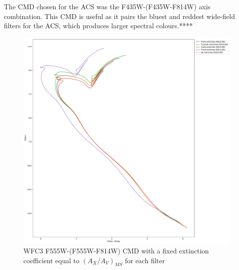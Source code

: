 \documentclass[12pt, a4paper]{report}
\begin{document}
The CMD chosen for the ACS was the F435W-(F435W-F814W) axis combination. This CMD is useful as it pairs the bluest and reddest wide-field filters for the ACS, which produces larger spectral colours.****

\begin{figure}[h]
\begin{center}
\includegraphics[scale=0.3]{../basti_isochrones_10_13Gyr/Extinction_T5k_FeH0fix_func_f555w_f555wmf814w_500_400_600_Myr_FeH_0p002_ref_noext_Av_1p0.pdf}
\caption{WFC3 F555W-(F555W-F814W) CMD with a fixed extinction coefficient equal to $(A_{X}/A_{V})_{MS}$ for each filter}
\label{wfc3_isoc1_T5k}
\end{center}
\end{figure}
\end{document}
